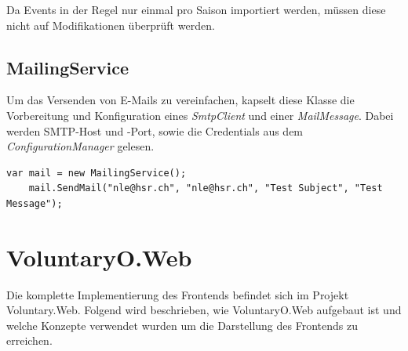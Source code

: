 			\noindent
			Da Events in der Regel nur einmal pro Saison importiert werden, müssen diese nicht auf Modifikationen überprüft werden.
	
	\subsection{MailingService}
		Um das Versenden von E-Mails zu vereinfachen, kapselt diese Klasse die Vorbereitung und Konfiguration eines \textit{SmtpClient} und einer \textit{MailMessage}. Dabei werden SMTP-Host und -Port, sowie die Credentials aus dem \textit{ConfigurationManager} gelesen.  

		\begin{lstlisting}[language=CSharp, caption=Verwendung des MailingService, label=lst:mailingservice, firstnumber=1]
	var mail = new MailingService();
	mail.SendMail("nle@hsr.ch", "nle@hsr.ch", "Test Subject", "Test Message");
	    \end{lstlisting}
    



\section{VoluntaryO.Web}
	Die komplette Implementierung des Frontends befindet sich im Projekt Voluntary.Web. Folgend wird beschrieben, wie VoluntaryO.Web aufgebaut ist und welche Konzepte verwendet wurden um die Darstellung des Frontends zu erreichen.

